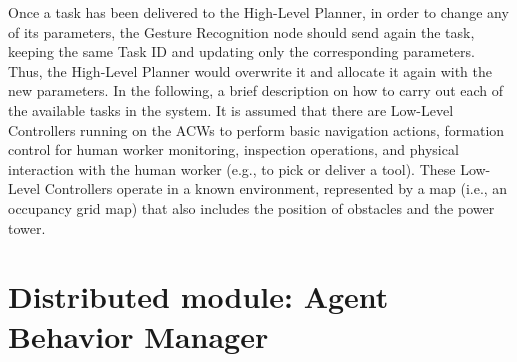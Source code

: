 Once a task has been delivered to the High-Level Planner, in order to change any of its parameters, the Gesture Recognition node should send again the task, keeping the same Task ID and updating only the corresponding parameters. Thus, the High-Level Planner would overwrite it and allocate it again with the new parameters. In the following, a brief description on how to carry out each of the available tasks in the system. It is assumed that there are Low-Level Controllers running on the \glspl{ACW} to perform basic navigation actions, formation control for human worker monitoring, inspection operations, and physical interaction with the human worker (e.g., to pick or deliver a tool). These Low-Level Controllers operate in a known environment, represented by a map (i.e., an occupancy grid map) that also includes the position of obstacles and the power tower.


\section{Distributed module: Agent Behavior Manager}
\label{sec:Distributed module: behavior manager}

